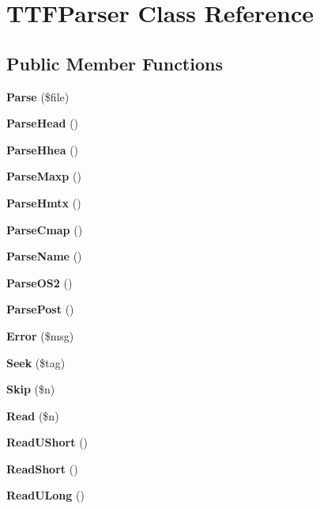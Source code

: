 \section{T\+T\+F\+Parser Class Reference}
\label{class_t_t_f_parser}
\subsection*{Public Member Functions}
\begin{DoxyCompactItemize}
\item 
{\bfseries Parse} (\$file)\label{class_t_t_f_parser_aa2836b6f3e07ca29366f32ec7bf7ecd8}

\item 
{\bfseries Parse\+Head} ()\label{class_t_t_f_parser_a589b7464b60fddbe1e6ef9a179959462}

\item 
{\bfseries Parse\+Hhea} ()\label{class_t_t_f_parser_a60f97b136da700fde617223c8f3210fe}

\item 
{\bfseries Parse\+Maxp} ()\label{class_t_t_f_parser_a2c4b70354150da23a54993df0399d661}

\item 
{\bfseries Parse\+Hmtx} ()\label{class_t_t_f_parser_ad053e15b1b09302d338ceac0e661b619}

\item 
{\bfseries Parse\+Cmap} ()\label{class_t_t_f_parser_a56d90fefb544fc500ae76833fe728daf}

\item 
{\bfseries Parse\+Name} ()\label{class_t_t_f_parser_ae99737a4c9e66ef058817dbeebd812e1}

\item 
{\bfseries Parse\+O\+S2} ()\label{class_t_t_f_parser_a6260f4bc6bd7fe50a4fb33ee5b8fb3b6}

\item 
{\bfseries Parse\+Post} ()\label{class_t_t_f_parser_af3c5c2524769c8e8a7dfa41b3c5b534e}

\item 
{\bfseries Error} (\$msg)\label{class_t_t_f_parser_a5afab85a7aaf19395f9a0e86cae76928}

\item 
{\bfseries Seek} (\$tag)\label{class_t_t_f_parser_a2aaff3c3732258885b208f2cb4d88251}

\item 
{\bfseries Skip} (\$n)\label{class_t_t_f_parser_aefcc4cfe660e099c06af89ae8f1df4d6}

\item 
{\bfseries Read} (\$n)\label{class_t_t_f_parser_a4991c5cbfffdafe9471e989845d28d47}

\item 
{\bfseries Read\+U\+Short} ()\label{class_t_t_f_parser_ac019280b3a4f686394a840044413af73}

\item 
{\bfseries Read\+Short} ()\label{class_t_t_f_parser_a43ae9b004d8ab710f0269b0afa89f422}

\item 
{\bfseries Read\+U\+Long} ()\label{class_t_t_f_parser_a3c935284182baaeb2712f85d4ed7dc01}

\end{DoxyCompactItemize}
